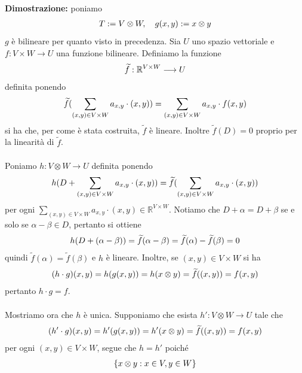 \documentclass{article}
\begin{document}
\textbf{Dimostrazione:} poniamo
\begin{gather}
    T := V \otimes W, \quad g(x, y) := x \otimes y \notag
\end{gather}
$g$ è bilineare per quanto visto in precedenza. Sia $U$ uno spazio vettoriale e $f : V \times W \longrightarrow U$ una funzione bilineare. Definiamo la funzione
\begin{gather}
    \widetilde{f} : \mathbb{R}^{V \times W} \longrightarrow U \notag
\end{gather}
definita ponendo
\begin{gather}
    \widetilde{f}(\sum_{(x, y) \in V \times W} a_{x, y} \cdot (x, y)) = \sum_{(x, y) \in V \times W} a_{x, y} \cdot f(x, y) \notag
\end{gather}
si ha che, per come è stata costruita, $\widetilde{f}$ è lineare. Inoltre $\widetilde{f}(D) = 0$ proprio per la linearità di $\widetilde{f}$. \\ \\
Poniamo $h : V \otimes W \longrightarrow U$ definita ponendo
\begin{gather}
    h(D + \sum_{(x, y) \in V \times W} a_{x, y} \cdot (x, y)) = \widetilde{f}(\sum_{(x, y) \in V \times W} a_{x, y} \cdot (x, y)) \notag
\end{gather}
per ogni $\sum_{(x, y) \in V \times W} a_{x, y} \cdot (x, y) \in \mathbb{R}^{V \times W}$. Notiamo che $D + \alpha = D + \beta$ se e solo se $\alpha - \beta \in D$, pertanto si ottiene
\begin{gather}
    h(D + (\alpha - \beta)) = \widetilde{f}(\alpha - \beta) = \widetilde{f}(\alpha) - \widetilde{f}(\beta) = 0 \notag
\end{gather}
quindi $\widetilde{f}(\alpha) = \widetilde{f}(\beta)$ e $h$ è lineare. Inoltre, se $(x, y) \in V \times W$ si ha
\begin{gather}
    (h \cdot g)(x, y) = h(g(x, y)) = h(x \otimes y) = \widetilde{f}((x, y)) = f(x, y) \notag
\end{gather}
pertanto $h \cdot g = f$. \\ \\
Mostriamo ora che $h$ è unica. Supponiamo che esista $h' : V \otimes W \longrightarrow U$ tale che
\begin{gather}
    (h' \cdot g)(x, y) = h'(g(x, y)) = h'(x \otimes y) = \widetilde{f}((x, y)) = f(x, y) \notag
\end{gather}
per ogni $(x, y) \in V \times W$, segue che $h = h'$ poiché
\begin{gather}
    \{ x \otimes y : x \in V, y \in W \} \notag
\end{gather}
\end{document}
